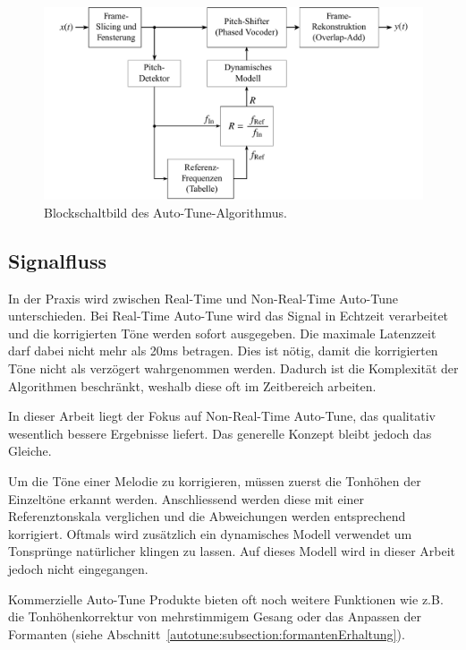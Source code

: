 \begin{figure}
	\centering
	\includegraphics[width=\textwidth]{papers/autotune/images/Blockdiagram.pdf}
	\caption{Blockschaltbild des Auto-Tune-Algorithmus.}
    \label{autotune:fig:blockschaltbild}
\end{figure}


\subsection{Signalfluss}
\label{autotune:subsection:signalfluss}
In der Praxis wird zwischen Real-Time und Non-Real-Time Auto-Tune unterschieden.
Bei Real-Time Auto-Tune wird das Signal in Echtzeit verarbeitet und die korrigierten Töne werden sofort ausgegeben.
Die maximale Latenzzeit darf dabei nicht mehr als 20\;ms betragen.
Dies ist nötig, damit die korrigierten Töne nicht als verzögert wahrgenommen werden.
Dadurch ist die Komplexität der Algorithmen beschränkt, weshalb diese oft im Zeitbereich arbeiten.

In dieser Arbeit liegt der Fokus auf Non-Real-Time Auto-Tune, das qualitativ wesentlich bessere Ergebnisse liefert.
Das generelle Konzept bleibt jedoch das Gleiche.

Um die Töne einer Melodie zu korrigieren, müssen zuerst die Tonhöhen der Einzeltöne erkannt werden.
Anschliessend werden diese mit einer Referenztonskala verglichen und die Abweichungen werden entsprechend korrigiert.
Oftmals wird zusätzlich ein dynamisches Modell verwendet um Tonsprünge natürlicher klingen zu lassen.
Auf dieses Modell wird in dieser Arbeit jedoch nicht eingegangen.

Kommerzielle Auto-Tune Produkte bieten oft noch weitere Funktionen wie z.B. die Tonhöhenkorrektur von mehrstimmigem Gesang oder das Anpassen der Formanten (siehe Abschnitt~\ref{autotune:subsection:formantenErhaltung}).
